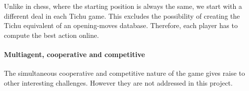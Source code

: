 Unlike in chess, where the starting position is always the same, we start with a different deal in each Tichu game. This excludes the possibility of creating the Tichu equivalent of an opening-moves database. Therefore, each player has to compute the best action online.

\paragraph{Multiagent, cooperative and competitive}
The simultaneous cooperative and competitive nature of the game gives raise to other interesting challenges. However they are not addressed in this project.
